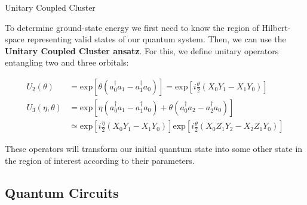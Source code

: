\documentclass[9pt, handout, aspectratio=169]{beamer}		%
\begin{document}
	\begin{frame}{Unitary Coupled Cluster}

		To determine ground-state energy we first need to know the region of Hilbert-space representing valid states of our quantum system. Then, we can use the \textbf{Unitary Coupled Cluster ansatz}. For this, we define unitary operators entangling two and three orbitals:

		\begin{align*}
			U_2(\theta) &= \text{exp} \left[ \theta(a_0^\dagger a_1 - a_1^\dagger a_0) \right] = \text{exp}\left[ i\frac{\theta}{2}(X_0 Y_1 - X_1 Y_0) \right] \\
			U_3(\eta, \theta) &= \text{exp} \left[ \eta(a_0^\dagger a_1 - a_1^\dagger a_0) + \theta(a_0^\dagger a_2 - a_2^\dagger a_0) \right] \\
			&\simeq \text{exp}\left[ i\frac{\eta}{2}(X_0 Y_1 - X_1 Y_0) \right] \text{exp}\left[ i\frac{\theta}{2}(X_0 Z_1 Y_2 - X_2 Z_1 Y_0) \right]
		\end{align*}

		These operators will transform our initial quantum state into some other state in the region of interest according to their parameters.

	\end{frame}


	\subsection{Quantum Circuits}
\end{document}
